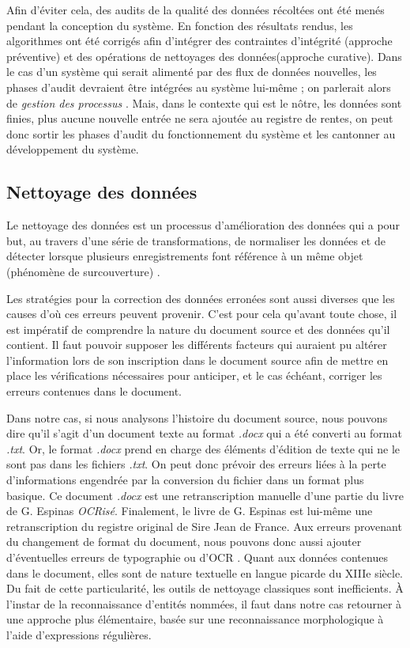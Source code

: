 Afin d'éviter cela, des audits de la qualité des données récoltées ont été menés pendant la conception du système. En fonction des résultats rendus, les algorithmes ont été corrigés afin d'intégrer des contraintes d'intégrité (approche préventive) et des opérations de nettoyages des données(approche curative).
Dans le cas d'un système qui serait alimenté par des flux de données nouvelles, les phases d'audit devraient être intégrées au système lui-même ; on parlerait alors de \textit{gestion des processus} \parencite{berti-equille_qualite_2004}. Mais, dans le contexte qui est le nôtre, les données sont finies, plus aucune nouvelle entrée ne sera ajoutée au registre de rentes, on peut donc sortir les phases d'audit du fonctionnement du système et les cantonner au développement du système.

\subsection{Nettoyage des données}
Le nettoyage des données est un processus d'amélioration des données qui a pour but, au travers d'une série de transformations, de normaliser les données et de détecter lorsque plusieurs enregistrements font référence à un même objet (phénomène de surcouverture) \parencite{berti-equille_qualite_2004}.

Les stratégies pour la correction des données erronées sont aussi diverses que les causes d'où ces erreurs peuvent provenir. C'est pour cela qu'avant toute chose, il est impératif de comprendre la nature du document source et des données qu'il contient. Il faut pouvoir supposer les différents facteurs qui auraient pu altérer l'information lors de son inscription dans le document source afin de mettre en place les vérifications nécessaires pour anticiper, et le cas échéant, corriger les erreurs contenues dans le document.

Dans notre cas, si nous analysons \og l'histoire \fg{} du document source, nous pouvons dire qu'il s'agit d'un document texte au format \textit{.docx} qui  a été converti au format \textit{.txt}. Or, le format \textit{.docx} prend en charge des éléments d'édition de texte qui ne le sont pas dans les fichiers \textit{.txt}. On peut donc prévoir des erreurs liées à la perte d'informations engendrée par la conversion du fichier dans un format plus basique. 
Ce document \textit{.docx} est une retranscription manuelle d'une partie du livre de G. Espinas \textit{OCRisé}.
Finalement, le livre de G. Espinas est lui-même une retranscription du registre original de Sire Jean de France. Aux erreurs provenant du changement de format du document, nous pouvons donc aussi ajouter d'éventuelles erreurs de typographie ou d'OCR \parencite{berti-equille_qualite_2004}.
Quant aux données contenues dans le document, elles sont de nature textuelle en langue picarde du XIIIe siècle. Du fait de cette particularité, les outils de nettoyage classiques sont inefficients. À l’instar de la reconnaissance d'entités nommées, il faut dans notre cas retourner à une approche plus élémentaire, basée sur une reconnaissance morphologique à l'aide d'expressions régulières. 

